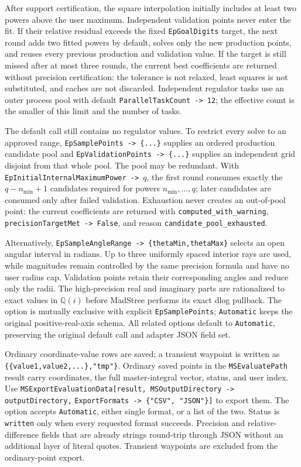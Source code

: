 \documentclass[11pt,a4paper]{article}
\begin{document}
After support certification, the square interpolation initially includes at least two powers
above the user maximum.  Independent validation points never enter the fit.  If their relative
residual exceeds the fixed \texttt{EpGoalDigits} target, the next round adds two fitted powers
by default, solves only the new production points, and reuses every previous production and
validation value.  If the target is still missed after at most three rounds, the current best
coefficients are returned without precision certification: the tolerance is not relaxed,
least squares is not substituted, and caches are not discarded.  Independent regulator tasks
use an outer process pool with default \texttt{ParallelTaskCount -> 12}; the effective count is
the smaller of this limit and the number of tasks.

The default call still contains no regulator values.  To restrict every solve to an approved
range, \texttt{EpSamplePoints -> \{...\}} supplies an ordered production candidate pool and
\texttt{EpValidationPoints -> \{...\}} supplies an independent grid disjoint from that whole
pool.  The pool may be redundant.  With
\texttt{EpInitialInternalMaximumPower -> $q$}, the first round consumes exactly the
$q-n_{\min}+1$ candidates required for powers $n_{\min},\ldots,q$; later candidates are consumed
only after failed validation.  Exhaustion never creates an out-of-pool point: the current
coefficients are returned with \texttt{computed\_with\_warning},
\texttt{precisionTargetMet -> False}, and reason \texttt{candidate\_pool\_exhausted}.

Alternatively, \texttt{EpSampleAngleRange -> \{thetaMin,thetaMax\}} selects an open angular
interval in radians.  Up to three uniformly spaced interior rays are used, while magnitudes remain
controlled by the same precision formula and have no user radius cap.  Validation points retain
their corresponding angles and reduce only the radii.  The high-precision real and imaginary parts
are rationalized to exact values in $\mathbb Q(i)$ before MadStree performs its exact dlog pullback.
The option is mutually exclusive with explicit \texttt{EpSamplePoints}; \texttt{Automatic} keeps
the original positive-real-axis schema.
All related options default to \texttt{Automatic}, preserving the original default call and
adapter JSON field set.

Ordinary coordinate-value rows are saved; a transient waypoint is written as
\texttt{\{\{value1,value2,...\},"tmp"\}}. Ordinary saved points in the \texttt{MSEvaluatePath} result
carry coordinates, the full master-integral vector, status, and user index. Use
\texttt{MSExportEvaluationData[result, MSOutputDirectory -> outputDirectory,}
\texttt{ExportFormats -> \{"CSV", "JSON"\}]} to export them. The option accepts
\texttt{Automatic}, either single format, or a list of the two. Status is \texttt{written} only
when every requested format succeeds. Precision and relative-difference fields that are already
strings round-trip through JSON without an additional layer of literal quotes. Transient waypoints
are excluded from the ordinary-point export.
\end{document}
